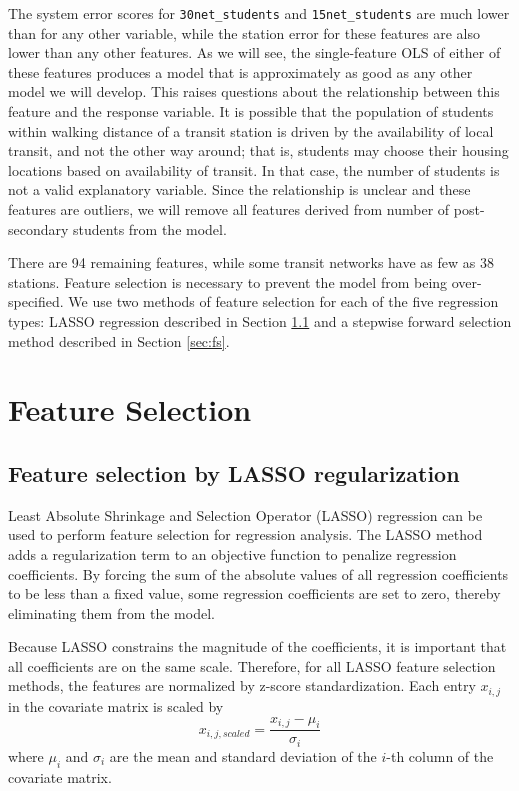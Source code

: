 \documentclass[11pt]{report}
\begin{document}
The system error scores for \texttt{30net\_students} and \texttt{15net\_students} are much lower than for any other variable, while the station error for these features are also lower than any other features. As we will see, the single-feature OLS of either of these features produces a model that is approximately as good as any other model we will develop. This raises questions about the relationship between this feature and the response variable. It is possible that the population of students within walking distance of a transit station is driven by the availability of local transit, and not the other way around; that is, students may choose their housing locations based on availability of transit. In that case, the number of students is not a valid explanatory variable. Since the relationship is unclear and these features are outliers, we will remove all features derived from number of post-secondary students from the model.

There are 94 remaining features, while some transit networks have as few as 38 stations. Feature selection is necessary to prevent the model from being over-specified. We use two methods of feature selection for each of the five regression types: LASSO regression described in Section \ref{sec:lasso} and a stepwise forward selection method described in Section \ref{sec:fs}. 

\section{Feature Selection}

\subsection{Feature selection by LASSO regularization}\label{sec:lasso}


Least Absolute Shrinkage and Selection Operator (LASSO) regression can be used to perform feature selection for regression analysis. The LASSO method adds a regularization term to an objective function to penalize regression coefficients. By forcing the sum of the absolute values of all regression coefficients to be less than a fixed value, some regression coefficients are set to zero, thereby eliminating them from the model. 

Because LASSO constrains the magnitude of the coefficients, it is important that all coefficients are on the same scale. Therefore, for all LASSO feature selection methods, the features are normalized by z-score standardization. Each entry $x_{i,j}$ in the covariate matrix is scaled by
$$ x_{i, j, scaled} = \frac{x_{i,j} - \mu_i}{\sigma_i}$$ where $\mu_i$ and $\sigma_i$ are the mean and standard deviation of the $i$-th column of the covariate matrix.
\end{document}
